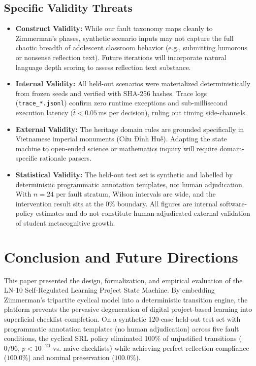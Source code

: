 \documentclass[11pt,a4paper]{article}
\begin{document}
\subsection{Specific Validity Threats}
\begin{itemize}
    \item \textbf{Construct Validity:} While our fault taxonomy maps cleanly to Zimmerman's phases, synthetic scenario inputs may not capture the full chaotic breadth of adolescent classroom behavior (e.g., submitting humorous or nonsense reflection text). Future iterations will incorporate natural language depth scoring to assess reflection text substance.
    \item \textbf{Internal Validity:} All held-out scenarios were materialized deterministically from frozen seeds and verified with SHA-256 hashes. Trace logs (\texttt{trace\_*.jsonl}) confirm zero runtime exceptions and sub-millisecond execution latency ($\bar{t} < 0.05\,\text{ms}$ per decision), ruling out timing side-channels.
    \item \textbf{External Validity:} The heritage domain rules are grounded specifically in Vietnamese imperial monuments (Cửu Đỉnh Huế). Adapting the state machine to open-ended science or mathematics inquiry will require domain-specific rationale parsers.
    \item \textbf{Statistical Validity:} The held-out test set is synthetic and labelled by deterministic programmatic annotation templates, not human adjudication. With $n=24$ per fault stratum, Wilson intervals are wide, and the intervention result sits at the 0\% boundary. All figures are internal software-policy estimates and do not constitute human-adjudicated external validation of student metacognitive growth.
\end{itemize}

\section{Conclusion and Future Directions}

This paper presented the design, formalization, and empirical evaluation of the LN-10 Self-Regulated Learning Project State Machine. By embedding Zimmerman's tripartite cyclical model into a deterministic transition engine, the platform prevents the pervasive degeneration of digital project-based learning into superficial checklist completion. On a synthetic 120-case held-out test set with programmatic annotation templates (no human adjudication) across five fault conditions, the cyclical SRL policy eliminated 100\% of unjustified transitions ($0/96$, $p < 10^{-20}$ vs. naive checklists) while achieving perfect reflection compliance ($100.0\%$) and nominal preservation ($100.0\%$).
\end{document}
